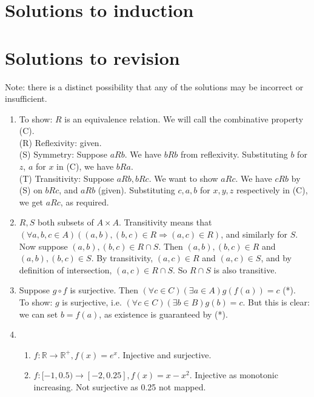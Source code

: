 \documentclass[10pt,a4paper]{article}
\begin{document}
\newpage

\section{Solutions to induction}

\section{Solutions to revision}
Note: there is a distinct possibility that any of the solutions may be incorrect or insufficient.

\begin{enumerate}
    \item To show: \(R\) is an equivalence relation. We will call the combinative property (C).\\
    (R) Reflexivity: given. \\
    (S) Symmetry: Suppose \( a R b \). We have \(b R b\) from reflexivity.
    Substituting \(b\) for \(z\), \(a\) for \(x\) in (C), we have \(b R a\). \\
    (T) Transitivity: Suppose \( a R b, b R c \). We want to show \( a R c \).
    We have \(c R b\) by (S) on \(b R c\), and \(a R b\) (given).
    Substituting \(c, a, b\) for \(x, y, z\) respectively in (C), we get \(a R c\), as required.

    \item \(R, S\) both subsets of \(A \times A\).
    Transitivity means that \( (\forall a, b, c \in A) \left( (a,b), (b,c) \in R \Rightarrow (a, c) \in R \right) \),
    and similarly for \(S\).
    Now suppose \((a,b), (b,c) \in R \cap S\). Then \((a,b), (b,c) \in R\) and \((a,b), (b,c) \in S\).
    By transitivity, \((a, c) \in R\) and \((a, c) \in S\), and by definition of intersection, 
    \((a, c) \in R \cap S\). So \(R \cap S\) is also transitive.

    \item Suppose \( g \circ f \) is surjective.
    Then \( (\forall c \in C) (\exists a \in A) g(f(a)) = c \) (*). \\
    To show: \(g \) is surjective, i.e. \( (\forall c \in C) (\exists b \in B) g(b) = c \).
    But this is clear: we can set \( b = f(a) \), as existence is guaranteed by (*).
    
    \item 
    \begin{enumerate}
        \item \( f : \mathbb{R} \rightarrow \mathbb{R}^+, f(x) = e^x \). Injective and surjective.
        \item \( f : [-1, 0.5) \rightarrow [-2, 0.25], f(x) = x - x^2 \).
        Injective as monotonic increasing. Not surjective as 0.25 not mapped.
    \end{enumerate}


\end{enumerate}
\end{document}
